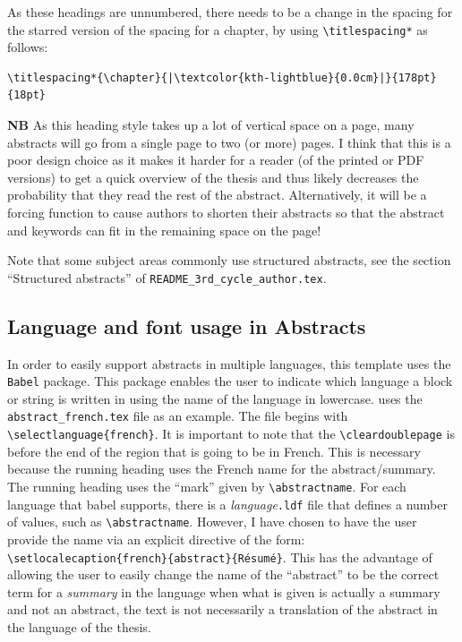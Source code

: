 \documentclass[12pt, twoside]{article}
\begin{document}
As these headings are unnumbered, there needs to be a change in the spacing for the starred version of the spacing for a chapter, by using \texttt{\textbackslash titlespacing*} as follows: 
\begin{lstlisting}[style=latexExampleForAuthors,  escapechar=|]
\titlespacing*{\chapter}{|\textcolor{kth-lightblue}{0.0cm}|}{178pt}{18pt}
\end{lstlisting}

\textbf{NB} As this heading style takes up a lot of vertical space on a page, many abstracts will go from a single page to two (or more) pages. I think that this is a poor design choice as it makes it harder for a reader (of the printed or PDF versions) to get a quick overview of the thesis and thus likely decreases the probability that they read the rest of the abstract. Alternatively, it will be a forcing function to cause authors to shorten their abstracts so that the abstract and keywords can fit in the remaining space on the page!

Note that some subject areas commonly use structured abstracts, see the section ``Structured abstracts'' of \texttt{README\_3rd\_cycle\_author.tex}.

\subsection{Language and font usage in Abstracts}
\label{sec:cycle3LanguagesInAbstracts}

In order to easily support abstracts in multiple languages, this template uses the \texttt{Babel} package. This package enables the user to indicate which language a block or string is written in using the name of the language in lowercase.  uses the \texttt{abstract\_french.tex} file as an example.
The file begins with \texttt{\textbackslash selectlanguage\{french\}}. It is important to note that the \texttt{\textbackslash cleardoublepage} is before the end of the region that is going to be in French. This is necessary because the running heading uses the French name for the abstract/summary. The running heading uses the ``mark'' given by \texttt{\textbackslash abstractname}. For each language that babel supports, there is a \hbox{\textit{language}\texttt{.ldf}} file that defines a number of values, such as \texttt{\textbackslash abstractname}. However, I have chosen to have the user provide the name via an explicit directive of the form: \texttt{\textbackslash setlocalecaption\{french\}\{abstract\}\{Résumé\}}. This has the advantage of allowing the user to easily change the name of the ``abstract'' to be the correct term for a \textit{summary} in the language when what is given is actually a summary and not an abstract, \ie the text is not necessarily a translation of the abstract in the language of the thesis.
\end{document}
